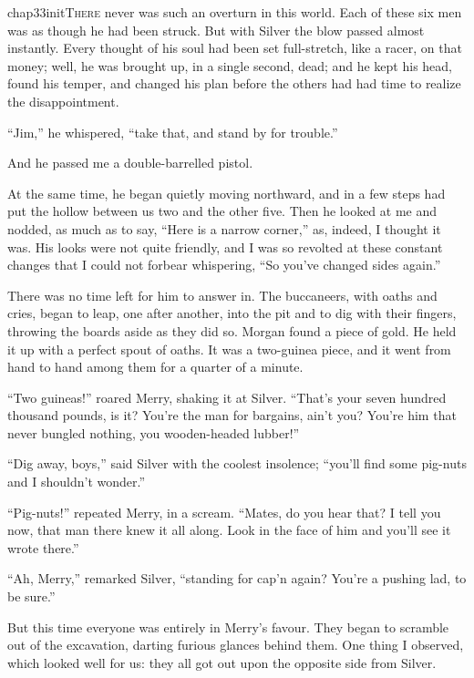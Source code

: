 
   \lettrine[lines=4,image=true]{chap33initT}{here} never was such an overturn in this world. Each of these six men was as though he had been struck. But with Silver the blow passed almost instantly. Every thought of his soul had been set full-stretch, like a racer, on that money; well, he was brought up, in a single second, dead; and he kept his head, found his temper, and changed his plan before the others had had time to realize the disappointment.

\enquote{Jim,} he whispered, \enquote{take that, and stand by for trouble.}

And he passed me a double-barrelled pistol.

At the same time, he began quietly moving northward, and in a few steps had put the hollow between us two and the other five. Then he looked at me and nodded, as much as to say, \enquote{Here is a narrow corner,} as, indeed, I thought it was. His looks were not quite friendly, and I was so revolted at these constant changes that I could not forbear whispering, \enquote{So you’ve changed sides again.}

There was no time left for him to answer in. The buccaneers, with oaths and cries, began to leap, one after another, into the pit and to dig with their fingers, throwing the boards aside as they did so. Morgan found a piece of gold. He held it up with a perfect spout of oaths. It was a two-guinea piece, and it went from hand to hand among them for a quarter of a minute.

\enquote{Two guineas!} roared Merry, shaking it at Silver. \enquote{That’s your seven hundred thousand pounds, is it? You’re the man for bargains, ain’t you? You’re him that never bungled nothing, you wooden-headed lubber!}

\enquote{Dig away, boys,} said Silver with the coolest insolence; \enquote{you’ll find some pig-nuts and I shouldn’t wonder.}

\enquote{Pig-nuts!} repeated Merry, in a scream. \enquote{Mates, do you hear that? I tell you now, that man there knew it all along. Look in the face of him and you’ll see it wrote there.}

\enquote{Ah, Merry,} remarked Silver, \enquote{standing for cap’n again? You’re a pushing lad, to be sure.}

But this time everyone was entirely in Merry’s favour. They began to scramble out of the excavation, darting furious glances behind them. One thing I observed, which looked well for us: they all got out upon the opposite side from Silver.

